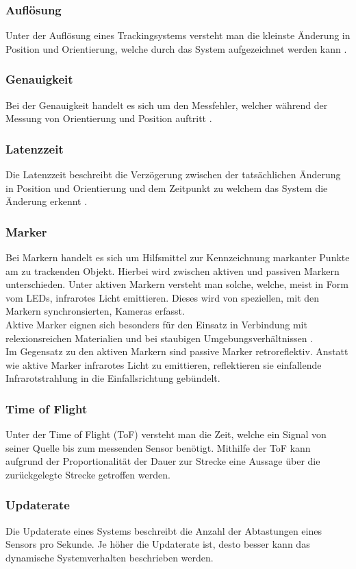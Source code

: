 \subsubsection{Auflösung}
Unter der Auflösung eines Trackingsystems versteht man die kleinste Änderung in Position und Orientierung, welche durch das System aufgezeichnet werden kann \cite{P25}.
\subsubsection{Genauigkeit}
Bei der Genauigkeit handelt es sich um den Messfehler, welcher während der Messung von Orientierung und Position auftritt \cite{P25}.
\subsubsection{Latenzzeit}
Die Latenzzeit beschreibt die Verzögerung zwischen der tatsächlichen Änderung in Position und Orientierung und dem Zeitpunkt zu welchem das System die Änderung erkennt \cite{vr}.
\subsubsection{Marker}
Bei Markern handelt es sich um Hilfsmittel zur Kennzeichnung markanter Punkte am zu trackenden Objekt. Hierbei wird zwischen aktiven und passiven Markern unterschieden.
Unter aktiven Markern versteht man solche, welche, meist in Form vom LEDs, infrarotes Licht emittieren. Dieses wird von speziellen, mit den Markern synchronsierten, Kameras erfasst. \cite{ART}
\\Aktive Marker eignen sich besonders für den Einsatz in Verbindung mit relexionsreichen Materialien und bei staubigen Umgebungsverhältnissen \cite{qualsys_act}.
\\Im Gegensatz zu den aktiven Markern sind passive Marker retroreflektiv. Anstatt wie aktive Marker infrarotes Licht zu emittieren, reflektieren sie einfallende Infrarotstrahlung in die Einfallsrichtung gebündelt. \cite{ART}
\subsubsection{Time of Flight}
Unter der Time of Flight (ToF) versteht man die Zeit, welche ein Signal von seiner Quelle bis zum messenden Sensor benötigt. Mithilfe der ToF kann aufgrund der Proportionalität der Dauer zur Strecke eine Aussage über die zurückgelegte Strecke getroffen werden. \cite{P24}
\subsubsection{Updaterate}
Die Updaterate eines Systems beschreibt die Anzahl der Abtastungen eines Sensors pro Sekunde. Je höher die Updaterate ist, desto besser kann das dynamische Systemverhalten beschrieben werden. \cite{vr}
